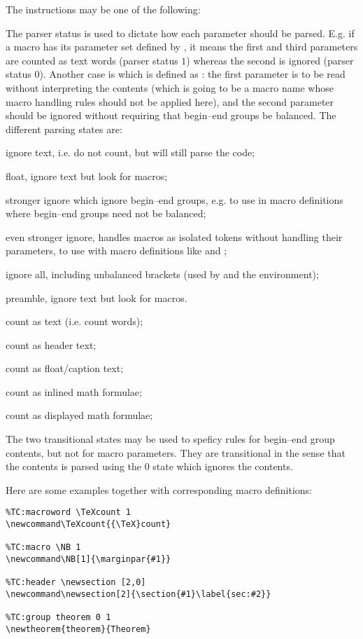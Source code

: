 \documentclass{article}
\begin{document}
The instructions may be one of the following:
%


The parser status is used to dictate how each parameter should be parsed. E.g. if a macro has its parameter set defined by \code{[1,0,1]}, it means the first and third parameters are counted as text words (parser status $1$) whereas the second is ignored (parser status $0$). Another case is  which is defined as \code{[-3,-2]}: the first parameter is to be read without interpreting the contents (which is going to be a macro name whose macro handling rules should not be applied here), and the second parameter should be ignored without requiring that begin--end groups be balanced. The different parsing states are:
%
\begin{description}
\def\optionhead#1{\item[\textbf{#1}]}
\def\option #1:{\item[{\makebox[7mm][r]{#1:}}]}
\optionhead{States for ignoring text}
\option 0: ignore text, i.e. do not count, but will still parse the code;
\option -1: float, ignore text but look for  macros;
\option -2: stronger ignore which ignore begin--end groups, e.g. to use in macro definitions where begin--end groups need not be balanced;
\option -3: even stronger ignore, handles macros as isolated tokens without handling their parameters, to use with macro definitions like  and ;
\option -4: ignore all, including unbalanced brackets (used by  and the  environment);
\option -9: preamble, ignore text but look for  macros.
\optionhead{States for counting words}
\option 1: count as text (i.e. count words);
\option 2: count as header text;
\option 3: count as float/caption text;
\optionhead{Transitional states (internal/limited use)}
\option 6: count as inlined math formulae;
\option 7: count as displayed math formulae;
\end{description}

The two transitional states may be used to speficy rules for begin--end group contents, but not for macro parameters. They are transitional in the sense that the contents is parsed using the 0 state which ignores the contents.

Here are some examples together with corresponding macro definitions:

\begin{lstlisting}
%TC:macroword \TeXcount 1
\newcommand\TeXcount{{\TeX}count}

%TC:macro \NB 1
\newcommand\NB[1]{\marginpar{#1}}

%TC:header \newsection [2,0]
\newcommand\newsection[2]{\section{#1}\label{sec:#2}}

%TC:group theorem 0 1
\newtheorem{theorem}{Theorem}
\end{lstlisting}
\end{document}
